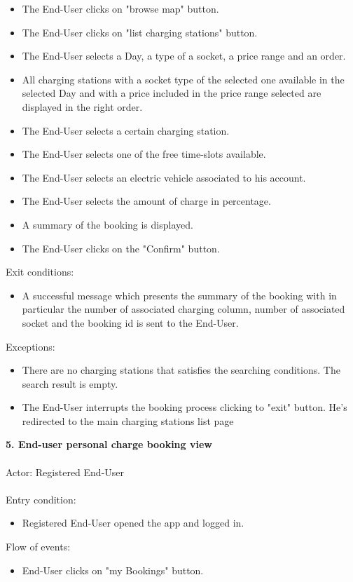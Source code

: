 \documentclass[a4paper]{report}
\begin{document}
\begin{itemize}
\item The End-User clicks on "browse map" button.
\item The End-User clicks on "list charging stations" button.
\item The End-User selects a Day, a type of a socket, a price range and an order.
\item All charging stations with a socket type of the selected one available in the selected Day and with a price included in the price range selected are displayed in the right order.
\item The End-User selects a certain charging station.
\item The End-User selects one of the free time-slots available.
\item The End-User selects an electric vehicle associated to his account.
\item The End-User selects the amount of charge in percentage.
\item A summary of the booking is displayed.
\item The End-User clicks on the "Confirm" button.
\end{itemize}
Exit conditions:
\begin{itemize}
\item A successful message which presents the summary of the booking with in particular the number of associated charging column, number of associated socket and the booking id is sent to the End-User.
 \end{itemize}
Exceptions:
 \begin{itemize}
 \item There are no charging stations that satisfies the searching conditions. The search result is empty.
 \item The End-User interrupts the booking process clicking to "exit" button. He's redirected to the main charging stations list page
\end{itemize}
\textbf{5. End-user personal charge booking view}\label{uc:8}
\\ \\
Actor: Registered End-User \\ \\
Entry condition:
\begin{itemize}
\item Registered End-User opened the app and logged in.
\end{itemize}
Flow of events:
\begin{itemize}
\item End-User clicks on "my Bookings" button.
\end{itemize}
\end{document}
